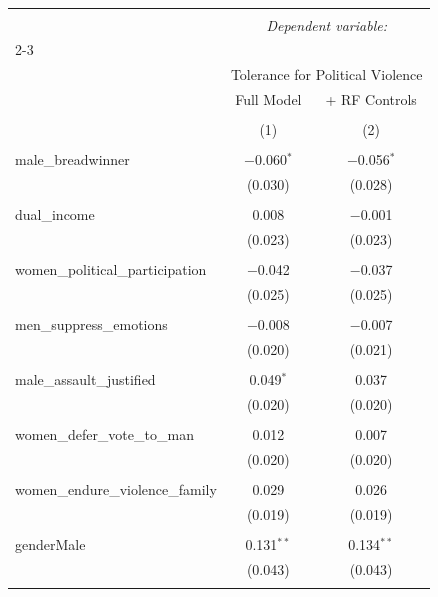 
\begin{table}[!htbp] \centering 
  \caption{} 
  \label{} 
\begin{tabular}{@{\extracolsep{5pt}}lcc} 
\\[-1.8ex]\hline 
\hline \\[-1.8ex] 
 & \multicolumn{2}{c}{\textit{Dependent variable:}} \\ 
\cline{2-3} 
\\[-1.8ex] & \multicolumn{2}{c}{Tolerance for Political Violence} \\ 
 & Full Model & + RF Controls \\ 
\\[-1.8ex] & (1) & (2)\\ 
\hline \\[-1.8ex] 
 male\_breadwinner & $-$0.060$^{*}$ & $-$0.056$^{*}$ \\ 
  & (0.030) & (0.028) \\ 
  & & \\ 
 dual\_income & 0.008 & $-$0.001 \\ 
  & (0.023) & (0.023) \\ 
  & & \\ 
 women\_political\_participation & $-$0.042 & $-$0.037 \\ 
  & (0.025) & (0.025) \\ 
  & & \\ 
 men\_suppress\_emotions & $-$0.008 & $-$0.007 \\ 
  & (0.020) & (0.021) \\ 
  & & \\ 
 male\_assault\_justified & 0.049$^{*}$ & 0.037 \\ 
  & (0.020) & (0.020) \\ 
  & & \\ 
 women\_defer\_vote\_to\_man & 0.012 & 0.007 \\ 
  & (0.020) & (0.020) \\ 
  & & \\ 
 women\_endure\_violence\_family & 0.029 & 0.026 \\ 
  & (0.019) & (0.019) \\ 
  & & \\ 
 genderMale & 0.131$^{**}$ & 0.134$^{**}$ \\ 
  & (0.043) & (0.043) \\ 
  & & \\ 

\end{tabular}
\end{table}
